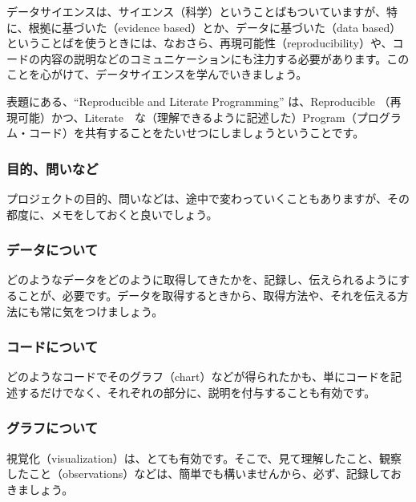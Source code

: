 \documentclass[
]{bxjsbook}
\theoremstyle{definition}
\theoremstyle{definition}
\theoremstyle{definition}
\theoremstyle{definition}
\theoremstyle{remark}
\begin{document}
データサイエンスは、サイエンス（科学）ということばもついていますが、特に、根拠に基づいた（evidence based）とか、データに基づいた（data based）ということばを使うときには、なおさら、再現可能性（reproducibility）や、コードの内容の説明などのコミュニケーションにも注力する必要があります。このことを心がけて、データサイエンスを学んでいきましょう。

表題にある、``Reproducible and Literate Programming'' は、Reproducible （再現可能）かつ、Literate　な（理解できるように記述した）Program（プログラム・コード）を共有することをたいせつにしましょうということです。

\hypertarget{ux76eeux7684ux554fux3044ux306aux3069}{%
\subsubsection{目的、問いなど}\label{ux76eeux7684ux554fux3044ux306aux3069}}

プロジェクトの目的、問いなどは、途中で変わっていくこともありますが、その都度に、メモをしておくと良いでしょう。

\hypertarget{ux30c7ux30fcux30bfux306bux3064ux3044ux3066}{%
\subsubsection{データについて}\label{ux30c7ux30fcux30bfux306bux3064ux3044ux3066}}

どのようなデータをどのように取得してきたかを、記録し、伝えられるようにすることが、必要です。データを取得するときから、取得方法や、それを伝える方法にも常に気をつけましょう。

\hypertarget{ux30b3ux30fcux30c9ux306bux3064ux3044ux3066}{%
\subsubsection{コードについて}\label{ux30b3ux30fcux30c9ux306bux3064ux3044ux3066}}

どのようなコードでそのグラフ（chart）などが得られたかも、単にコードを記述するだけでなく、それぞれの部分に、説明を付与することも有効です。

\hypertarget{ux30b0ux30e9ux30d5ux306bux3064ux3044ux3066}{%
\subsubsection{グラフについて}\label{ux30b0ux30e9ux30d5ux306bux3064ux3044ux3066}}

視覚化（visualization）は、とても有効です。そこで、見て理解したこと、観察したこと（observations）などは、簡単でも構いませんから、必ず、記録しておきましょう。
\end{document}
